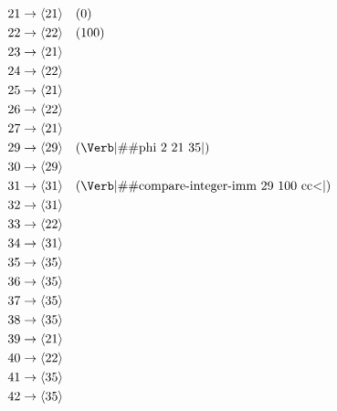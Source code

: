 \begin{align*}
  21 &\to \vn{21} \quad (0)                                                \\
  22 &\to \vn{22} \quad (100)                                              \\
  23 &\to \vn{21}                                                          \\
  24 &\to \vn{22}                                                          \\
  25 &\to \vn{21}                                                          \\
  26 &\to \vn{22}                                                          \\
  27 &\to \vn{21}                                                          \\
  29 &\to \vn{29} \quad (\text{\Verb|\#\#phi 2 21 35|})                    \\
  30 &\to \vn{29}                                                          \\
  31 &\to \vn{31} \quad (\text{\Verb|\#\#compare-integer-imm 29 100 cc<|}) \\
  32 &\to \vn{31}                                                          \\
  33 &\to \vn{22}                                                          \\
  34 &\to \vn{31}                                                          \\
  35 &\to \vn{35}                                                          \\
  36 &\to \vn{35}                                                          \\
  37 &\to \vn{35}                                                          \\
  38 &\to \vn{35}                                                          \\
  39 &\to \vn{21}                                                          \\
  40 &\to \vn{22}                                                          \\
  41 &\to \vn{35}                                                          \\
  42 &\to \vn{35}
\end{align*}

